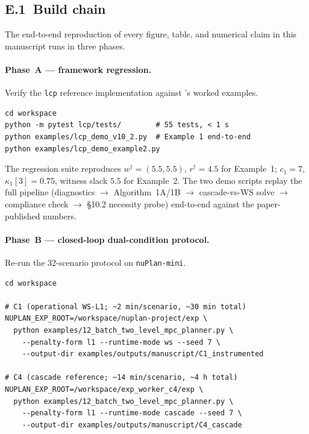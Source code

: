 
\subsection*{E.1\ Build chain}

The end-to-end reproduction of every figure, table, and numerical claim in this manuscript runs in three phases.

\paragraph{Phase~A --- framework regression.} Verify the \texttt{lcp} reference implementation against \cite{lcp2025}'s worked examples.

\begin{verbatim}
cd workspace
python -m pytest lcp/tests/        # 55 tests, < 1 s
python examples/lcp_demo_v10_2.py  # Example 1 end-to-end
python examples/lcp_demo_example2.py
\end{verbatim}

The regression suite reproduces $w^\dagger = (5.5, 5.5)$, $r^\dagger = 4.5$ for Example~1; $c_1 = 7$, $\kappa_1[3] = 0.75$, witness slack $5.5$ for Example~2. The two demo scripts replay the full pipeline (diagnostics $\to$ Algorithm~1A/1B $\to$ cascade-vs-WS solve $\to$ compliance check $\to$ \S10.2 necessity probe) end-to-end against the paper-published numbers.

\paragraph{Phase~B --- closed-loop dual-condition protocol.} Re-run the 32-scenario protocol on \texttt{nuPlan-mini}.

\begin{verbatim}
cd workspace

# C1 (operational WS-L1; ~2 min/scenario, ~30 min total)
NUPLAN_EXP_ROOT=/workspace/nuplan-project/exp \
  python examples/12_batch_two_level_mpc_planner.py \
    --penalty-form l1 --runtime-mode ws --seed 7 \
    --output-dir examples/outputs/manuscript/C1_instrumented

# C4 (cascade reference; ~14 min/scenario, ~4 h total)
NUPLAN_EXP_ROOT=/workspace/exp_worker_c4/exp \
  python examples/12_batch_two_level_mpc_planner.py \
    --penalty-form l1 --runtime-mode cascade --seed 7 \
    --output-dir examples/outputs/manuscript/C4_cascade
\end{verbatim}

